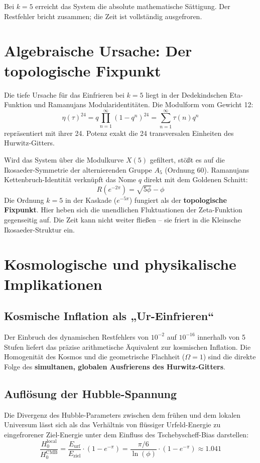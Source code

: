 \documentclass[11pt,a4paper]{article}
\begin{document}
Bei $k=5$ erreicht das System die absolute mathematische Sättigung. Der Restfehler bricht zusammen; die Zeit ist vollständig ausgefroren.

\section{Algebraische Ursache: Der topologische Fixpunkt}
Die tiefe Ursache für das Einfrieren bei $k=5$ liegt in der Dedekindschen Eta-Funktion und Ramanujans Modularidentitäten. Die Modulform vom Gewicht 12:
\begin{equation}
\eta(\tau)^{24} = q \prod_{n=1}^{\infty} (1-q^n)^{24} = \sum_{n=1}^{\infty} \tau(n) q^n
\end{equation}
repräsentiert mit ihrer 24. Potenz exakt die 24 transversalen Einheiten des Hurwitz-Gitters. 

Wird das System über die Modulkurve $X(5)$ gefiltert, stößt es auf die Ikosaeder-Symmetrie der alternierenden Gruppe $A_5$ (Ordnung 60). Ramanujans Kettenbruch-Identität verknüpft das Nome $q$ direkt mit dem Goldenen Schnitt:
\begin{equation}
R(e^{-2\pi}) = \sqrt{5\phi} - \phi
\end{equation}
Die Ordnung $k=5$ in der Kaskade ($e^{-5\pi}$) fungiert als der \textbf{topologische Fixpunkt}. Hier heben sich die unendlichen Fluktuationen der Zeta-Funktion gegenseitig auf. Die Zeit kann nicht weiter fließen -- sie friert in die Kleinsche Ikosaeder-Struktur ein.

\section{Kosmologische und physikalische Implikationen}

\subsection{Kosmische Inflation als „Ur-Einfrieren“}
Der Einbruch des dynamischen Restfehlers von $10^{-2}$ auf $10^{-16}$ innerhalb von 5 Stufen liefert das präzise arithmetische Äquivalent zur kosmischen Inflation. Die Homogenität des Kosmos und die geometrische Flachheit ($\Omega=1$) sind die direkte Folge des \textbf{simultanen, globalen Ausfrierens des Hurwitz-Gitters}.

\subsection{Auflösung der Hubble-Spannung}
Die Divergenz des Hubble-Parameters zwischen dem frühen und dem lokalen Universum lässt sich als das Verhältnis von flüssiger Urfeld-Energie zu eingefrorener Ziel-Energie unter dem Einfluss des Tschebyscheff-Bias darstellen:
\begin{equation}
\frac{H_0^{\text{local}}}{H_0^{\text{CMB}}} = \frac{E_{\text{urf}}}{E_{\text{ziel}}} \cdot (1 - e^{-\pi}) = \frac{\pi/6}{\ln(\phi)} \cdot (1 - e^{-\pi}) \approx 1.041
\end{equation}
\end{document}
